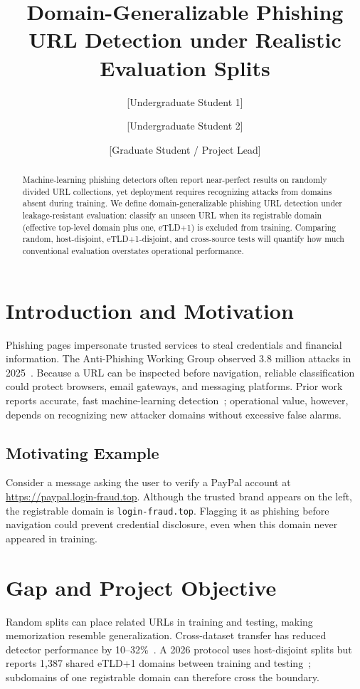 \documentclass[sigconf,nonacm]{acmart}
\title{Domain-Generalizable Phishing URL Detection under Realistic Evaluation Splits}
\author{[Undergraduate Student 1]}
\affiliation{%
  \institution{[University Name]}
  \city{[City]}
  \country{[Country]}}
\author{[Undergraduate Student 2]}
\affiliation{%
  \institution{[University Name]}
  \city{[City]}
  \country{[Country]}}
\author{[Graduate Student / Project Lead]}
\affiliation{%
  \institution{[University Name]}
  \city{[City]}
  \country{[Country]}}
\begin{document}
\begin{abstract}
Machine-learning phishing detectors often report near-perfect results on randomly divided URL collections, yet deployment requires recognizing attacks from domains absent during training. We define domain-generalizable phishing URL detection under leakage-resistant evaluation: classify an unseen URL when its registrable domain (effective top-level domain plus one, eTLD+1) is excluded from training. Comparing random, host-disjoint, eTLD+1-disjoint, and cross-source tests will quantify how much conventional evaluation overstates operational performance.
\end{abstract}

\maketitle

\section{Introduction and Motivation}
Phishing pages impersonate trusted services to steal credentials and financial information. The Anti-Phishing Working Group observed 3.8 million attacks in 2025~\cite{apwg2026}. Because a URL can be inspected before navigation, reliable classification could protect browsers, email gateways, and messaging platforms. Prior work reports accurate, fast machine-learning detection~\cite{sahingoz2019,prasad2024}; operational value, however, depends on recognizing new attacker domains without excessive false alarms.

\subsection{Motivating Example}
Consider a message asking the user to verify a PayPal account at \url{https://paypal.login-fraud.top}. Although the trusted brand appears on the left, the registrable domain is \texttt{login-fraud.top}. Flagging it as phishing before navigation could prevent credential disclosure, even when this domain never appeared in training.

\section{Gap and Project Objective}
Random splits can place related URLs in training and testing, making memorization resemble generalization. Cross-dataset transfer has reduced detector performance by 10--32\%~\cite{rashid2024}. A 2026 protocol uses host-disjoint splits but reports 1,387 shared eTLD+1 domains between training and testing~\cite{ahamed2026}; subdomains of one registrable domain can therefore cross the boundary.
\end{document}
